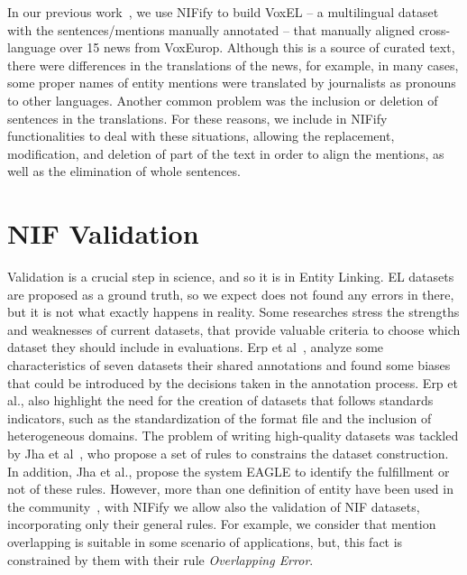 \documentclass[sigconf]{acmart}
\begin{document}
In our previous work~\cite{VoxEL2018}, we use NIFify to build VoxEL -- a multilingual dataset with the sentences/mentions manually annotated -- that manually aligned cross-language over 15 news from VoxEurop. Although this is a source of curated text, there were differences in the translations of the news, for example, in many cases, some proper names of entity mentions were translated by journalists as pronouns to other languages. Another common problem was the inclusion or deletion of sentences in the translations. For these reasons, we include in NIFify functionalities to deal with these situations, allowing the replacement, modification, and deletion of part of the text in order to align the mentions, as well as the elimination of whole sentences. 

\section{NIF Validation}

Validation is a crucial step in science, and so it is in Entity Linking. EL datasets are proposed as a ground truth, so we expect does not found any errors in there, but it is not what exactly happens in reality. Some researches stress the strengths and weaknesses of current datasets, that provide valuable criteria to choose which dataset they should include in evaluations. Erp et al~\cite{Marieke2016}, analyze some characteristics of seven datasets their shared annotations and found some biases that could be introduced by the decisions taken in the annotation process. Erp et al., also highlight the need for the creation of datasets that follows standards indicators, such as the standardization of the format file and the inclusion of heterogeneous domains. The problem of writing high-quality datasets was tackled by Jha et al~\cite{Kunal2017}, who propose a set of rules to constrains the dataset construction. In addition, Jha et al., propose the system EAGLE to identify the fulfillment or not of these rules. However, more than one definition of entity have been used in the community~\cite{ourAMW2018}, with NIFify we allow also the validation of NIF datasets, incorporating only their general rules. For example, we consider that mention overlapping is suitable in some scenario of applications, but, this fact is constrained by them with their rule \textit{Overlapping Error}.
\end{document}
